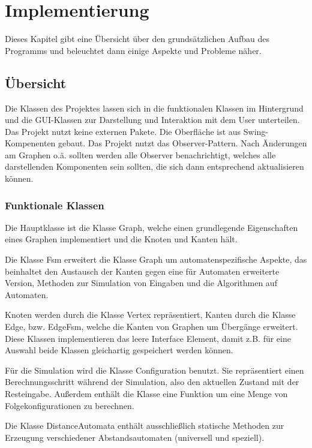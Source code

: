 \chapter{Implementierung}\label{Implementierung}
Dieses Kapitel gibt eine Übersicht über den grundsätzlichen Aufbau des Programms und beleuchtet dann einige Aspekte und Probleme näher.
\section{Übersicht}
Die Klassen des Projektes lassen sich in die funktionalen Klassen im Hintergrund und die GUI-Klassen zur Darstellung und Interaktion mit dem User unterteilen. Das Projekt nutzt keine externen Pakete. Die Oberfläche ist aus Swing-Kompenenten gebaut. Das Projekt nutzt das Observer-Pattern. Nach Änderungen am Graphen o.ä. sollten werden alle Observer benachrichtigt, welches alle darstellenden Komponenten sein sollten, die sich dann entsprechend aktualisieren können.
\subsection{Funktionale Klassen}
Die Hauptklasse ist die Klasse Graph, welche einen grundlegende Eigenschaften eines Graphen implementiert und die Knoten und Kanten hält.

Die Klasse Fsm erweitert die Klasse Graph um automatenspezifische Aspekte, das beinhaltet den Austausch der Kanten gegen eine für Automaten erweiterte Version, Methoden zur Simulation von Eingaben und die Algorithmen auf Automaten.

Knoten werden durch die Klasse Vertex repräsentiert, Kanten durch die Klasse Edge, bzw. EdgeFsm, welche die Kanten von Graphen um Übergänge erweitert. Diese Klassen implementieren das leere Interface Element, damit z.B. für eine Auswahl beide Klassen gleichartig gespeichert werden können.

Für die Simulation wird die Klasse Configuration benutzt. Sie repräsentiert einen Berechnungsschritt während der Simulation, also den aktuellen Zustand mit der Rest\-eingabe. Außerdem enthält die Klasse eine Funktion um eine Menge von Folgekonfigurationen zu berechnen.

Die Klasse DistanceAutomata enthält ausschließlich statische Methoden zur Erzeugung verschiedener Abstandsautomaten (universell und speziell).

